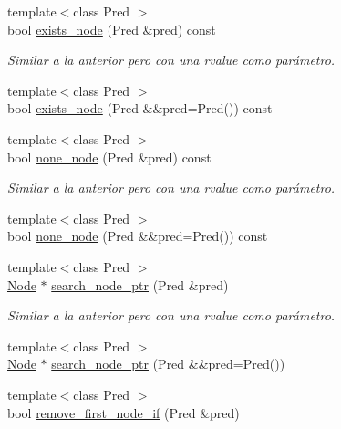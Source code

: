 \begin{DoxyCompactItemize}
{\footnotesize template$<$class Pred $>$ }\\bool \hyperlink{class_designar_1_1_base_graph_a3631470de61b819211c72fdd2ac31b34}{exists\+\_\+node} (Pred \&pred) const
\begin{DoxyCompactList}\small\item\em Similar a la anterior pero con una rvalue como parámetro. \end{DoxyCompactList}\item 
{\footnotesize template$<$class Pred $>$ }\\bool \hyperlink{class_designar_1_1_base_graph_a62df2c7ec71d2b009e96f8974968a3fc}{exists\+\_\+node} (Pred \&\&pred=Pred()) const
\item 
{\footnotesize template$<$class Pred $>$ }\\bool \hyperlink{class_designar_1_1_base_graph_aa87c903e7fbf82a30edc9e442a115050}{none\+\_\+node} (Pred \&pred) const
\begin{DoxyCompactList}\small\item\em Similar a la anterior pero con una rvalue como parámetro. \end{DoxyCompactList}\item 
{\footnotesize template$<$class Pred $>$ }\\bool \hyperlink{class_designar_1_1_base_graph_a394cdb81d0b0402e348dc87d2456d2d7}{none\+\_\+node} (Pred \&\&pred=Pred()) const
\item 
{\footnotesize template$<$class Pred $>$ }\\\hyperlink{namespace_designar_a5af326c65aa2bd26b26c410f2030d09e}{Node} $\ast$ \hyperlink{class_designar_1_1_base_graph_aa15b13f58a4961b1593045d1e228adec}{search\+\_\+node\+\_\+ptr} (Pred \&pred)
\begin{DoxyCompactList}\small\item\em Similar a la anterior pero con una rvalue como parámetro. \end{DoxyCompactList}\item 
{\footnotesize template$<$class Pred $>$ }\\\hyperlink{namespace_designar_a5af326c65aa2bd26b26c410f2030d09e}{Node} $\ast$ \hyperlink{class_designar_1_1_base_graph_a1f19e5a79bfa156fd4cd80f3d8e27aa4}{search\+\_\+node\+\_\+ptr} (Pred \&\&pred=Pred())
\item 
{\footnotesize template$<$class Pred $>$ }\\bool \hyperlink{class_designar_1_1_base_graph_a1311af417ba4d373d7051b73cc2696ec}{remove\+\_\+first\+\_\+node\+\_\+if} (Pred \&pred)

\end{DoxyCompactItemize}
